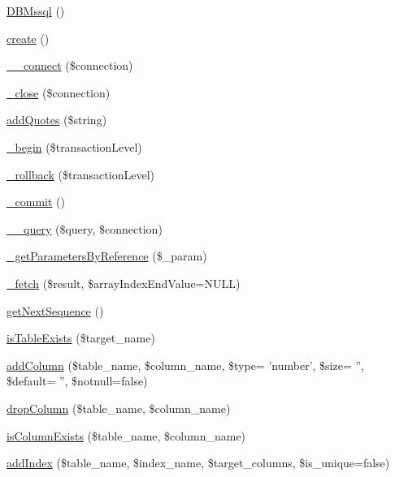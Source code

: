 \begin{DoxyCompactItemize}
\item 
\hyperlink{classDBMssql_a308e7ed895b32bedb958b2fa946fb499}{D\+B\+Mssql} ()
\item 
\hyperlink{classDBMssql_a1be3ce3432e43e0a5080ada450971345}{create} ()
\item 
\hyperlink{classDBMssql_a369f968ee79e1eb30e5d640c2294a7d1}{\+\_\+\+\_\+connect} (\$connection)
\item 
\hyperlink{classDBMssql_a64f2fc08d576cdcfc0dd3a80343a0e5a}{\+\_\+close} (\$connection)
\item 
\hyperlink{classDBMssql_ac380f1918abd17fd5cba28accfaec9fc}{add\+Quotes} (\$string)
\item 
\hyperlink{classDBMssql_a28ba9e00e3fce08dfabc334a1365fd5a}{\+\_\+begin} (\$transaction\+Level)
\item 
\hyperlink{classDBMssql_a36d00363d093e06fe3db4dbce6e8beaf}{\+\_\+rollback} (\$transaction\+Level)
\item 
\hyperlink{classDBMssql_a08f359cc1c5ce91fde7139446252e8c4}{\+\_\+commit} ()
\item 
\hyperlink{classDBMssql_aa2d0d2f6680d70399f493b567d94ed92}{\+\_\+\+\_\+query} (\$query, \$connection)
\item 
\hyperlink{classDBMssql_a09c8011c16ac2e01c6fca9d6f0e6b7f6}{\+\_\+get\+Parameters\+By\+Reference} (\$\+\_\+param)
\item 
\hyperlink{classDBMssql_aed12cc502a2d8ee9ce8821af12d45b9e}{\+\_\+fetch} (\$result, \$array\+Index\+End\+Value=N\+U\+L\+L)
\item 
\hyperlink{classDBMssql_ad4342b7988253c6bbeec102b2c454659}{get\+Next\+Sequence} ()
\item 
\hyperlink{classDBMssql_add743e9c5148edf4f393209b1f4b9cd6}{is\+Table\+Exists} (\$target\+\_\+name)
\item 
\hyperlink{classDBMssql_a4a5a3cc78312f22673d7e3a4d1a5c8cf}{add\+Column} (\$table\+\_\+name, \$column\+\_\+name, \$type= 'number', \$size= '', \$default= '', \$notnull=false)
\item 
\hyperlink{classDBMssql_a802707618ed283cd4143c82972b3ade5}{drop\+Column} (\$table\+\_\+name, \$column\+\_\+name)
\item 
\hyperlink{classDBMssql_a5a96979e7fed50503b902d2983fa507a}{is\+Column\+Exists} (\$table\+\_\+name, \$column\+\_\+name)
\item 
\hyperlink{classDBMssql_a6202a3b8e96252f91ef104a854cf556c}{add\+Index} (\$table\+\_\+name, \$index\+\_\+name, \$target\+\_\+columns, \$is\+\_\+unique=false)

\end{DoxyCompactItemize}
